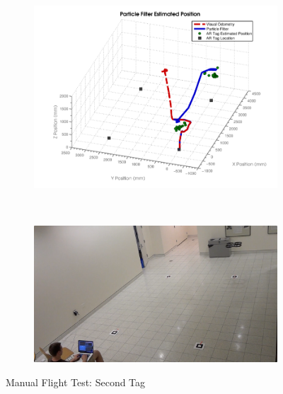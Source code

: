 	\begin{figure}[ht]
	        \centering
	        \begin{subfigure}[b]{0.75\textwidth}
	                \centering
	                \includegraphics[width=\textwidth]{../images/3dgraph_48.png}
	                \label{fig:tag2}
	        \end{subfigure}%
	        \\
	        \begin{subfigure}[b]{0.75\textwidth}
	                \centering
	                \includegraphics[width=\textwidth]{../images/frame2.png}
	                \label{fig:frame2}
	        \end{subfigure}
	        \caption{Manual Flight Test: Second Tag}
	\end{figure}

